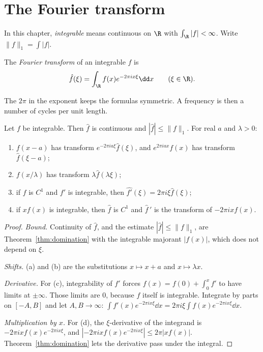 \section{The Fourier transform}

In this chapter, \emph{integrable} means continuous on $\R$ with $\int_{\R}|f|<\infty$. Write $\|f\|_1=\int|f|$.

\begin{definition}
The \emph{Fourier transform} of an integrable $f$ is
\[
\hat f(\xi)=\int_{\R}f(x)e^{-2\pi ix\xi}\dd x\qquad(\xi\in\R).
\]
\end{definition}

The $2\pi$ in the exponent keeps the formulas symmetric. A frequency is then a number of cycles per unit length.

\begin{proposition}\label{prop:ftbasic}
Let $f$ be integrable. Then $\hat f$ is continuous and $|\hat f|\le\|f\|_1$. For real $a$ and $\lambda>0$:
\begin{enumerate}[label=(\alph*)]
\item $f(x-a)$ has transform $e^{-2\pi ia\xi}\hat f(\xi)$, and $e^{2\pi iax}f(x)$ has transform $\hat f(\xi-a)$;
\item $f(x/\lambda)$ has transform $\lambda\hat f(\lambda\xi)$;
\item if $f$ is $C^1$ and $f'$ is integrable, then $\widehat{f'}(\xi)=2\pi i\xi\hat f(\xi)$;
\item if $xf(x)$ is integrable, then $\hat f$ is $C^1$ and $\hat f\,'$ is the transform of $-2\pi ixf(x)$.
\end{enumerate}
\end{proposition}
\begin{proof}
\emph{Bound.} Continuity of $\hat f$, and the estimate $|\hat f|\le\|f\|_1$, are Theorem~\ref{thm:domination} with the integrable majorant $|f(x)|$, which does not depend on $\xi$.

\emph{Shifts.} (a) and (b) are the substitutions $x\mapsto x+a$ and $x\mapsto\lambda x$.

\emph{Derivative.} For (c), integrability of $f'$ forces $f(x)=f(0)+\int_0^xf'$ to have limits at $\pm\infty$. Those limits are $0$, because $f$ itself is integrable. Integrate by parts on $[-A,B]$ and let $A,B\to\infty$: $\int f'(x)e^{-2\pi ix\xi}\dd x=2\pi i\xi\int f(x)e^{-2\pi ix\xi}\dd x$.

\emph{Multiplication by $x$.} For (d), the $\xi$-derivative of the integrand is $-2\pi ixf(x)e^{-2\pi ix\xi}$, and $|-2\pi ixf(x)e^{-2\pi ix\xi}|\le 2\pi|xf(x)|$. Theorem~\ref{thm:domination} lets the derivative pass under the integral.
\end{proof}

